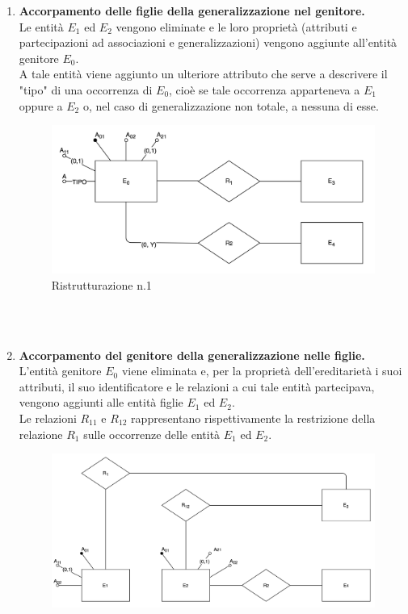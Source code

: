     \begin{enumerate}
        \item{\textbf{Accorpamento delle figlie della generalizzazione nel genitore.}\\
        Le entità $E_1$ ed $E_2$ vengono eliminate e le loro proprietà (attributi e partecipazioni ad associazioni e generalizzazioni) vengono aggiunte all'entità genitore $E_0$.\\
        A tale entità viene aggiunto un ulteriore attributo che serve a descrivere il "tipo" di una occorrenza di $E_0$, cioè se tale occorrenza apparteneva a $E_1$ oppure a $E_2$ o, nel caso di generalizzazione non totale, a nessuna di esse.
            \begin{figure}[h!]
                \centering
                \includegraphics[scale=0.6]{15/img1}
                \caption{Ristrutturazione n.1}
            \end{figure}\\\\}
        \item{\textbf{Accorpamento del genitore della generalizzazione nelle figlie.}\\
        L'entità genitore $E_0$ viene eliminata e, per la proprietà dell'ereditarietà i suoi attributi, il suo identificatore e le relazioni a cui tale entità partecipava, vengono aggiunti alle entità figlie $E_1$ ed $E_2$.\\
        Le relazioni $R_{11}$ e $R_{12}$ rappresentano rispettivamente la restrizione della relazione $R_1$ sulle occorrenze delle entità $E_1$ ed $E_2$.
            \begin{figure}[h!]
                \centering
                \includegraphics[scale=0.5]{15/img2}

\end{figure}}
\end{enumerate}
